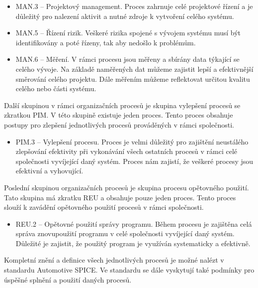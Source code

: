 \documentclass[czech,master,public,dept460,male,cpdeclaration,oneside]{diploma}
\begin{document}
\begin{itemize}
	\item MAN.3 -- Projektový management. Proces zahrnuje celé projektové řízení a je důležitý pro nalezení aktivit a nutné zdroje k vytvoření celého systému.
	\item MAN.5 -- Řízení rizik. Veškeré rizika spojené s vývojem systému musí být identifikovány a poté řízeny, tak aby nedošlo k problémům.
	\item MAN.6 -- Měření. V rámci procesu jsou měřeny a sbírány data týkající se celého vývoje. Na základě naměřených dat můžeme zajistit lepší a efektivnější směrování celého projektu. Dále měřením můžeme reflektovat určitou kvalitu celého nebo části systému.
\end{itemize}

Další skupinou v rámci organizačních procesů je skupina vylepšení procesů se zkratkou PIM. V této skupině existuje jeden proces. Tento proces obsahuje postupy pro zlepšení jednotlivých procesů prováděných v rámci společnosti.

\begin{itemize}
	\item PIM.3 -- Vylepšení procesu. Proces je velmi důležitý pro zajištění neustálého zlepšování efektivity při vykonávání všech ostatních procesů v rámci celé společnosti vyvíjející daný systém. Proces nám zajistí, že veškeré procesy jsou efektivní a vyhovující.
\end{itemize}

Poslední skupinou organizačních procesů je skupina procesu opětovného použití. Tato skupina má zkratku REU a obsahuje pouze jeden proces. Tento proces slouží k zavádění opětovného použití procesů v rámci společnosti.

\begin{itemize}
	\item REU.2 -- Opětovné použití správy programu. Během procesu je zajištěna celá správa znovupoužití programu v celé společnosti vyvíjející daný systém. Důležité je zajistit, že použitý program je využíván systematicky a efektivně.
\end{itemize}


Kompletní znění a definice všech jednotlivých procesů je možné nalézt v standardu Automotive SPICE. \cite{ref:aspice_procesy} Ve standardu se dále vyskytují také podmínky pro úspěšné splnění a použití daných procesů.
\end{document}
